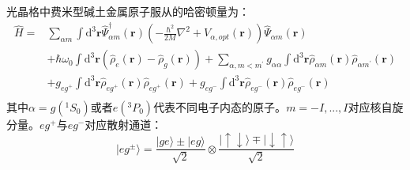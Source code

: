 光晶格中费米型碱土金属原子服从的哈密顿量为：
\begin{equation}
\begin{aligned}
\hat{H}=& \sum_{\alpha m} \int \mathrm{d}^{3} \mathbf{r} \hat{\Psi}_{\alpha m}^{\dagger}(\mathbf{r})\left(-\frac{\hbar^{2}}{2 M} \nabla^{2}+V_{\alpha,opt}(\mathbf{r})\right) \hat{\Psi}_{\alpha m}(\mathbf{r}) \\
&+\hbar \omega_{0} \int \mathrm{d}^{3} \mathbf{r}\left(\hat{\rho}_{e}(\mathbf{r})-\hat{\rho}_{g}(\mathbf{r})\right)+ \sum_{\alpha, m<m^{\prime}} g_{\alpha \alpha} \int \mathrm{d}^{3} \mathbf{r} \hat{\rho}_{\alpha m}(\mathbf{r}) \hat{\rho}_{\alpha m^{\prime}}(\mathbf{r})  \\
&+ g_{e g^+} \int \mathrm{d}^{3} \mathbf{r} \hat{\rho}_{eg^+}(\mathbf{r}) \hat{\rho}_{eg^+}(\mathbf{r})+g_{e g^-} \int \mathrm{d}^{3} \mathbf{r} \hat{\rho}_{eg^-}(\mathbf{r}) \hat{\rho}_{eg^-}(\mathbf{r})\\
\end{aligned}
\end{equation}
其中$\alpha=g({^1S_0})$或者$e({}^3P_0)$代表不同电子内态的原子。$m=-I,...,I$对应核自旋分量。$eg^+$与$eg^-$对应散射通道：
\begin{equation}
|eg^{\pm}\rangle = \frac{|ge\rangle\pm|eg\rangle}{\sqrt{2}}\otimes\frac{|\uparrow\downarrow\rangle\mp|\downarrow\uparrow \rangle}{\sqrt{2}}
\end{equation}

